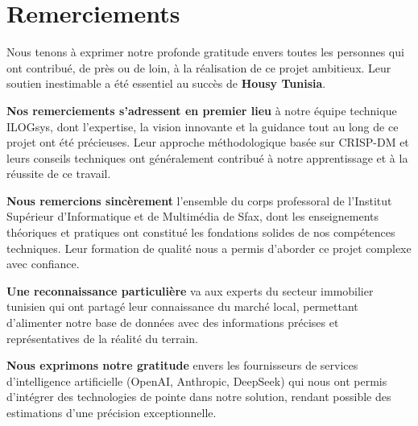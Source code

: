 
\chapter*{Remerciements}

\vspace{1cm}

Nous tenons à exprimer notre profonde gratitude envers toutes les personnes qui ont contribué, de près ou de loin, à la réalisation de ce projet ambitieux. Leur soutien inestimable a été essentiel au succès de \textbf{Housy Tunisia}.

\vspace{0.8cm}

\textbf{Nos remerciements s'adressent en premier lieu} à notre équipe technique ILOGsys, dont l'expertise, la vision innovante et la guidance tout au long de ce projet ont été précieuses. Leur approche méthodologique basée sur CRISP-DM et leurs conseils techniques ont généralement contribué à notre apprentissage et à la réussite de ce travail.

\vspace{0.8cm}

\textbf{Nous remercions sincèrement} l'ensemble du corps professoral de l'Institut Supérieur d'Informatique et de Multimédia de Sfax, dont les enseignements théoriques et pratiques ont constitué les fondations solides de nos compétences techniques. Leur formation de qualité nous a permis d'aborder ce projet complexe avec confiance.

\vspace{0.8cm}

\textbf{Une reconnaissance particulière} va aux experts du secteur immobilier tunisien qui ont partagé leur connaissance du marché local, permettant d'alimenter notre base de données avec des informations précises et représentatives de la réalité du terrain.

\vspace{0.8cm}

\textbf{Nous exprimons notre gratitude} envers les fournisseurs de services d'intelligence artificielle (OpenAI, Anthropic, DeepSeek) qui nous ont permis d'intégrer des technologies de pointe dans notre solution, rendant possible des estimations d'une précision exceptionnelle.

